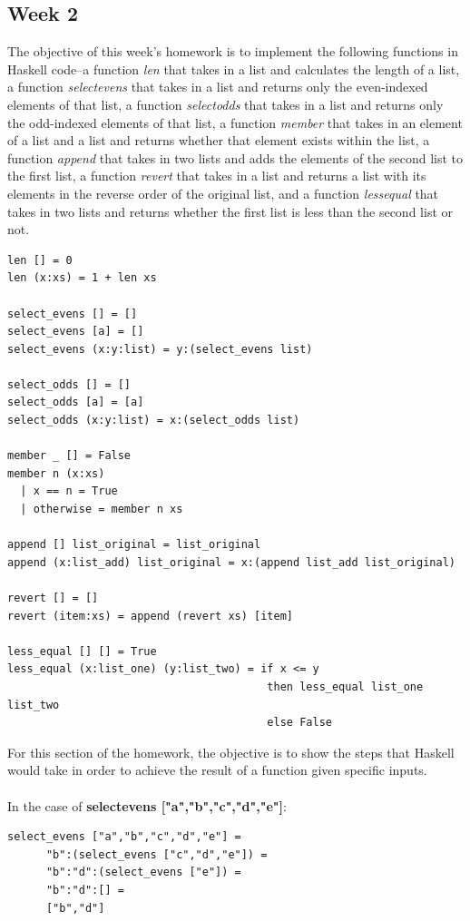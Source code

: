 \documentclass{article}
\theoremstyle{theorem}
\theoremstyle{definition}
\theoremstyle{remark}
\begin{document}
\subsection{Week 2}
The objective of this week's homework is to implement the following functions in Haskell code--a function \textit{len} that takes in a list and calculates the length of a list, a function \textit{select\textunderscore evens} that takes in a list and returns only the even-indexed elements of that list, a function \textit{select\textunderscore odds} that takes in a list and returns only the odd-indexed elements of that list, a function \textit{member} that takes in an element of a list and a list and returns whether that element exists within the list, a function \textit{append} that takes in two lists and adds the elements of the second list to the first list, a function \textit{revert} that takes in a list and returns a list with its elements in the reverse order of the original list, and a function \textit{less\textunderscore equal} that takes in two lists and returns whether the first list is less than the second list or not.
\begin{lstlisting}
len [] = 0
len (x:xs) = 1 + len xs

select_evens [] = []
select_evens [a] = []
select_evens (x:y:list) = y:(select_evens list)

select_odds [] = []
select_odds [a] = [a]
select_odds (x:y:list) = x:(select_odds list)

member _ [] = False
member n (x:xs)
  | x == n = True
  | otherwise = member n xs

append [] list_original = list_original
append (x:list_add) list_original = x:(append list_add list_original)

revert [] = []
revert (item:xs) = append (revert xs) [item]

less_equal [] [] = True
less_equal (x:list_one) (y:list_two) = if x <= y
									    then less_equal list_one list_two
									    else False
\end{lstlisting}
For this section of the homework, the objective is to show the steps that Haskell would take in order to achieve the result of a function given specific inputs.
\\
\\
In the case of \textbf{select\textunderscore evens ["a","b","c","d","e"]}:
\begin{lstlisting}
select_evens ["a","b","c","d","e"] =
      "b":(select_evens ["c","d","e"]) =
      "b":"d":(select_evens ["e"]) =
      "b":"d":[] =
      ["b","d"]
\end{lstlisting}
\end{document}

